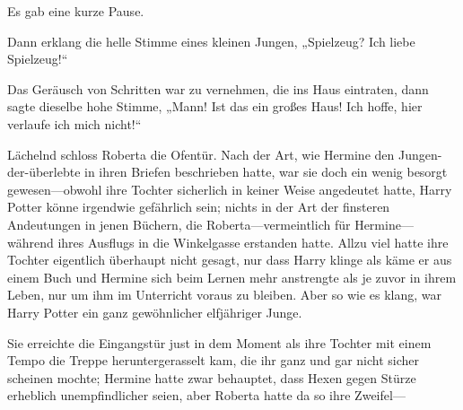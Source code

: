 Es gab eine kurze Pause.

Dann erklang die helle Stimme eines kleinen Jungen, „Spielzeug? Ich liebe Spielzeug!“

Das Geräusch von Schritten war zu vernehmen, die ins Haus eintraten, dann sagte dieselbe hohe Stimme, „Mann! Ist das ein großes Haus! Ich hoffe, hier verlaufe ich mich nicht!“

Lächelnd schloss Roberta die Ofentür. Nach der Art, wie Hermine den Jungen-der-überlebte in ihren Briefen beschrieben hatte, war sie doch ein wenig besorgt gewesen—obwohl ihre Tochter sicherlich in keiner Weise angedeutet hatte, Harry Potter könne irgendwie gefährlich sein; nichts in der Art der finsteren Andeutungen in jenen Büchern, die Roberta—vermeintlich für Hermine—während ihres Ausflugs in die Winkelgasse erstanden hatte. Allzu viel hatte ihre Tochter eigentlich überhaupt nicht gesagt, nur dass Harry klinge als käme er aus einem Buch und Hermine sich beim Lernen mehr anstrengte als je zuvor in ihrem Leben, nur um ihm im Unterricht voraus zu bleiben. Aber so wie es klang, war Harry Potter ein ganz gewöhnlicher elfjähriger Junge.

Sie erreichte die Eingangstür just in dem Moment als ihre Tochter mit einem Tempo die Treppe heruntergerasselt kam, die ihr ganz und gar nicht sicher scheinen mochte; Hermine hatte zwar behauptet, dass Hexen gegen Stürze erheblich unempfindlicher seien, aber Roberta hatte da so ihre Zweifel—

